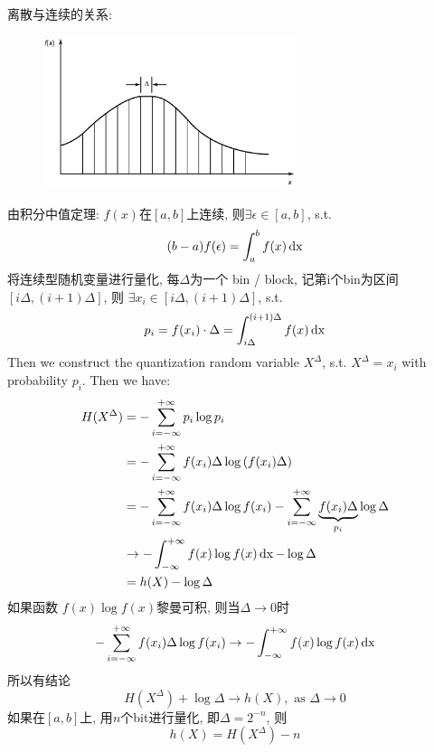 \begin{proposition}
离散与连续的关系:
\begin{figure}[htbp]
    \centering
    \includegraphics[width=0.66\textwidth]{./figures/chapter6/quantization.png}
\end{figure}
\end{proposition}
由积分中值定理: $f(x)$在$[a,b]$上连续, 则$\exists \epsilon\in[a,b]$, s.t. $$(b-a)f(\epsilon)=\int_a^b f(x) \operatorname{dx}$$
将连续型随机变量进行量化, 每$\Delta$为一个 bin / block, 记第i个bin为区间$[i\Delta, (i+1)\Delta]$, 则 $\exists x_i\in [i\Delta, (i+1)\Delta]$, s.t.
$$p_i=f(x_i)\cdot\Delta = \int_{i\Delta}^{(i+1)\Delta} f(x) \operatorname{dx}$$
Then we construct the quantization random variable $X^{\Delta}$, s.t. $X^{\Delta}=x_i$ with probability $p_i$. Then we have:
\begin{align*}
H(X^{\Delta}) &= -\sum_{i=-\infty}^{+\infty} p_i\log p_i \\
&= -\sum_{i=-\infty}^{+\infty} f(x_i)\Delta\log \left(f(x_i)\Delta\right) \\
&= -\sum_{i=-\infty}^{+\infty} f(x_i)\Delta\log f(x_i) -  \sum_{i=-\infty}^{+\infty} \underbrace{f(x_i)\Delta}_{p_i}\log \Delta \\
&\to -\int_{-\infty}^{+\infty} f(x)\log f(x) \operatorname{dx} - \log \Delta \\
&= h(X) - \log \Delta
\end{align*}
如果函数 $f(x)\log f(x)$黎曼可积, 则当$\Delta\to 0$时
$$-\sum_{i=-\infty}^{+\infty} f(x_i)\Delta\log f(x_i)\to -\int_{-\infty}^{+\infty} f(x)\log f(x) \operatorname{dx}$$
所以有结论
$$H(X^{\Delta}) + \log \Delta \to h(X), \text{ as } \Delta\to 0$$
如果在$[a,b]$上, 用$n$个bit进行量化, 即$\Delta = 2^{-n}$, 则
$$h(X) = H(X^{\Delta}) - n$$
